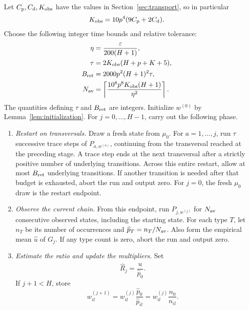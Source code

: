 Let \(C_{\rm p},C_{\rm d},K_{\rm obs}\) have the values in
Section~\ref{sec:transport}, so in particular
\[
 K_{\rm obs}=10p^4(9C_{\rm p}+2C_{\rm d}).
\]
Choose the following integer time bounds and relative tolerance:
\begin{equation}
\begin{split}
 \eta&=\frac{\epsilon}{200(H+1)},\\
 \tau&=2K_{\rm obs}(H+p+K+5),\\
 B_{\rm ret}&=2000p^2(H+1)^2\tau,\\
 N_{\rm av}
 &=\left\lceil
 \frac{10^8p^8K_{\rm obs}(H+1)}{\eta^2}
 \right\rceil.
\end{split}
\label{eq:alg-phase-parameters}
\end{equation}
The quantities defining \(\tau\) and \(B_{\rm ret}\) are integers.
Initialize \(w^{(0)}\) by Lemma~\ref{lem:initialization}.  For
\(j=0,\ldots,H-1\), carry out the following phase.

\begin{enumerate}[label=\textbf{\arabic*.},leftmargin=*]
\item
\emph{Restart on transversals.}
Draw a fresh state from \(\mu_0\).  For \(a=1,\ldots,j\), run
\(\tau\) successive trace steps of \(P_{a,w^{(a)}}\), continuing
from the transversal reached at the preceding stage.  A trace step
ends at the next transversal after a strictly positive number of
underlying transitions.  Across this entire restart, allow at most
\(B_{\rm ret}\) underlying transitions.  If another transition is
needed after that budget is exhausted, abort the run and output zero.
For \(j=0\), the fresh \(\mu_0\) draw is the restart endpoint.

\item
\emph{Observe the current chain.}
From this endpoint, run \(P_{j,w^{(j)}}\) for \(N_{\rm av}\)
consecutive observed states, including the starting state.  For each
type \(T\), let \(n_T\) be its number of occurrences and
\(\widehat p_T=n_T/N_{\rm av}\).
Also form the empirical mean \(\widehat u\) of \(G_j\).
If any type count is zero, abort the run and output zero.

\item
\emph{Estimate the ratio and update the multipliers.}
Set
\begin{equation}
 \widehat R_j=\frac{\widehat u}{\widehat p_0}.
 \label{eq:alg-ratio-estimate}
\end{equation}
If \(j+1<H\), store
\begin{equation}
 w_{il}^{(j+1)}
 =w_{il}^{(j)}\frac{\widehat p_0}{\widehat p_{il}}
 =w_{il}^{(j)}\frac{n_0}{n_{il}}.
 \label{eq:alg-multiplier-update}
\end{equation}
\end{enumerate}

